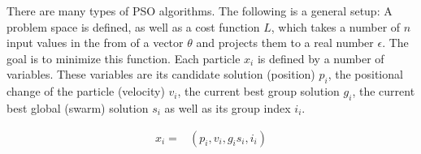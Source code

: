 There are many types of PSO algorithms. The following is a general setup:\newline
A problem space is defined, as well as a cost function $L$, which takes a number of $n$ input values in the from of a vector $\theta$ and projects them
to a real number $\epsilon$. The goal is to minimize this function. Each particle $x_i$ is defined by a number of variables. These variables are
its candidate solution (position) $p_i$, the positional change of the particle (velocity) $v_i$, the current best group solution $g_i$, the
current best global (swarm) solution $s_i$ as well as its group index $i_i$.

\begin{align}
	x_i =& (p_i, v_i, g_i s_i, i_i)
\end{align}




